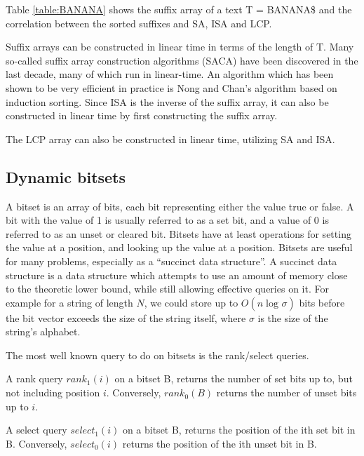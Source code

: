 Table \ref{table:BANANA} shows the suffix array of a text T = BANANA\$ and the correlation
between the sorted suffixes and SA, ISA and LCP.


Suffix arrays can be constructed in linear time in terms of the length of T. Many
so-called suffix array construction algorithms (SACA) have been discovered in the last
decade\cite{SuffixArrayConstruction}, many of which run in linear-time. An algorithm
which has been shown to be very efficient in practice is Nong and
Chan's\cite{LinearTimeSuffixArraySAIS} algorithm based on induction sorting. Since ISA is
the inverse of the suffix array, it can also be constructed in linear time by first
constructing the suffix array.

The LCP array can also be constructed in linear time, utilizing SA and ISA.



\subsection{Dynamic bitsets}

A bitset is an array of bits, each bit representing either the value true or false. A bit
with the value of 1 is usually referred to as a set bit, and a value of 0 is referred to
as an unset or cleared bit. Bitsets have at least operations for setting the value at a
position, and looking up the value at a position. Bitsets are useful for many problems,
especially as a ``succinct data structure''. A succinct data structure is a data structure
which attempts to use an amount of memory close to the theoretic lower bound, while still
allowing effective queries on it. For example for a string of length $N$, we could store
up to $O(n \log_{}\sigma)$ bits before the bit vector exceeds the size of the string
itself, where $\sigma$ is the size of the string's alphabet.

The most well known query to do on bitsets is the rank/select queries.

\begin{definition}
    A rank query $rank_1(i)$ on a bitset B, returns the number of set bits
    up to, but not including position $i$. Conversely, $rank_0(B)$ returns the number of
    unset bits up to $i$.
\end{definition}
\begin{definition}
    A select query $select_1(i)$ on a bitset B, returns the position of the ith
    set bit in B. Conversely, $select_0(i)$ returns the position of the ith unset bit in
    B.
\end{definition}

